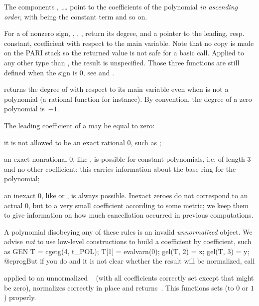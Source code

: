 The components , ,\dots {} point to the
coefficients of the polynomial \emph{in ascending order}, with 
being the constant term and so on.

For a  of nonzero sign, , ,
, return its degree, and a pointer to the leading,
resp. constant, coefficient with respect to the main variable. Note that no
copy is made on the PARI stack so the returned value is not safe for a basic
 call. Applied to any other type than , the result is
unspecified. Those three functions are still defined when the sign is $0$,
see  and .

 returns the degree of  with respect to its
main variable even when  is not a polynomial (a rational function for
instance). By convention, the degree of a zero polynomial is~$-1$.

The leading coefficient of a  may be equal to zero:

\item it is not allowed to be an exact rational $0$, such as ;

\item an exact nonrational $0$, like , is possible for
constant polynomials, i.e. of length $3$ and no other coefficient: this
carries information about the base ring for the polynomial;

\item an inexact $0$, like  or , is always
possible. Inexact zeroes do not correspond to an actual $0$, but to a
very small coefficient according to some metric; we keep them to give
information on how much cancellation occurred in previous computations.

A polynomial disobeying any of these rules is an invalid \emph{unnormalized}
object. We advise \emph{not} to use low-level constructions to build a
 coefficient by coefficient, such as
\bprog
  GEN T = cgetg(4, t_POL);
  T[1] = evalvarn(0);
  gel(T, 2) = x;
  gel(T, 3) = y;
@eprog\noindent But if you do and it is not clear whether the result will be
normalized, call

 applied to an unnormalized ~
(with all coefficients correctly set except that  might
be zero), normalizes  correctly in place and returns~. This
functions sets  (to $0$ or $1$) properly.

